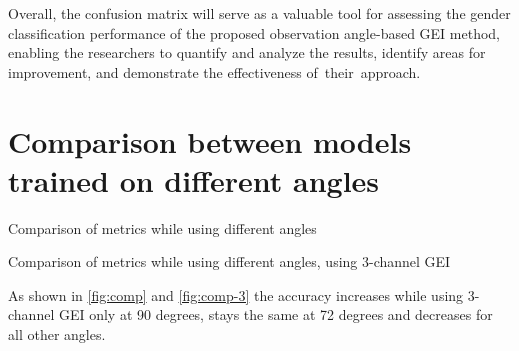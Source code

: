 Overall, the confusion matrix will serve as a valuable tool for assessing the gender classification performance of the proposed observation angle-based GEI method, enabling the researchers to quantify and analyze the results, identify areas for improvement, and demonstrate the effectiveness of their approach.


\section{Comparison between models trained on different angles}

\begin{table}
    \centering
    
    \caption{Comparison of metrics while using different angles}
    \label{fig:comp}
\end{table}

\begin{table}
    \centering
    
    \caption{Comparison of metrics while using different angles, using 3-channel GEI}
    \label{fig:comp-3}
\end{table}

As shown in \ref{fig:comp} and \ref{fig:comp-3} the accuracy increases while using 3-channel GEI only at 90 degrees, stays the same at 72 degrees and decreases for all other angles.